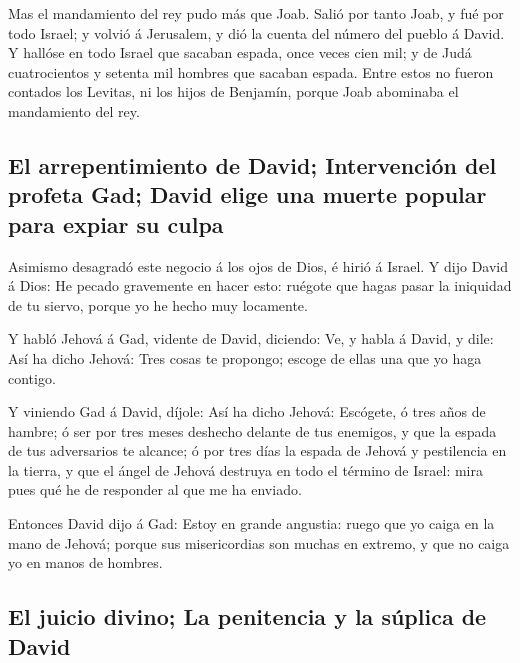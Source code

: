  Mas el mandamiento del rey pudo más que Joab. Salió por
tanto Joab, y fué por todo Israel; y volvió á Jerusalem, y dió la cuenta
del número del pueblo á David.  Y hallóse en todo Israel
que sacaban espada, once veces cien mil; y de Judá cuatrocientos y
setenta mil hombres que sacaban espada.  Entre estos no
fueron contados los Levitas, ni los hijos de Benjamín, porque Joab
abominaba el mandamiento del rey.

\hypertarget{el-arrepentimiento-de-david-intervenciuxf3n-del-profeta-gad-david-elige-una-muerte-popular-para-expiar-su-culpa}{%
\subsection{El arrepentimiento de David; Intervención del profeta Gad;
David elige una muerte popular para expiar su
culpa}\label{el-arrepentimiento-de-david-intervenciuxf3n-del-profeta-gad-david-elige-una-muerte-popular-para-expiar-su-culpa}}

 Asimismo desagradó este negocio á los ojos de Dios, é
hirió á Israel.  Y dijo David á Dios: He pecado gravemente
en hacer esto: ruégote que hagas pasar la iniquidad de tu siervo, porque
yo he hecho muy locamente.

 Y habló Jehová á Gad, vidente de David, diciendo:
 Ve, y habla á David, y dile: Así ha dicho Jehová: Tres
cosas te propongo; escoge de ellas una que yo haga contigo.

 Y viniendo Gad á David, díjole: Así ha dicho Jehová:
 Escógete, ó tres años de hambre; ó ser por tres meses
deshecho delante de tus enemigos, y que la espada de tus adversarios te
alcance; ó por tres días la espada de Jehová y pestilencia en la tierra,
y que el ángel de Jehová destruya en todo el término de Israel: mira
pues qué he de responder al que me ha enviado.

 Entonces David dijo á Gad: Estoy en grande angustia:
ruego que yo caiga en la mano de Jehová; porque sus misericordias son
muchas en extremo, y que no caiga yo en manos de hombres.

\hypertarget{el-juicio-divino-la-penitencia-y-la-suxfaplica-de-david}{%
\subsection{El juicio divino; La penitencia y la súplica de
David}\label{el-juicio-divino-la-penitencia-y-la-suxfaplica-de-david}}


